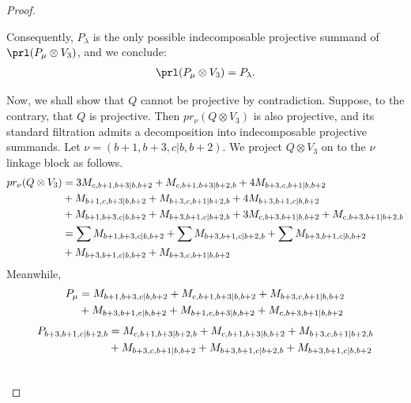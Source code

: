 \begin{proof}
\begin{enumerate}
\begin{enumerate}
Consequently, $P_\lambda$ is the only possible indecomposable projective summand of $\prl(P_\mu \otimes V_3)$, and we conclude:
\begin{equation}\notag
  \begin{aligned}
\prl(P_\mu \otimes V_3) = P_\lambda.
  \end{aligned}
\end{equation}

Now, we shall show that $Q$ cannot be projective by contradiction.
Suppose, to the contrary, that $Q$ is projective. Then $pr_\nu(Q \otimes V_3)$ is also projective, and its standard filtration admits a decomposition into indecomposable projective summands.
Let $\nu = (b+1,b+3,c|b,b+2)$. We project $Q \otimes V_3$ on to the $\nu$ linkage block as follows.
\begin{equation}\notag
  \begin{aligned}
    pr_\nu(Q \otimes V_3) &= 
3M_{c,b+1,b+3|b,b+2}
+M_{c,b+1,b+3|b+2,b}
+4M_{b+3,c,b+1|b,b+2}\\
                                              &
+M_{b+1,c,b+3|b,b+2}
+M_{b+3,c,b+1|b+2,b}
+4M_{b+3,b+1,c|b,b+2}\\
                                              &
+M_{b+1,b+3,c|b,b+2}
+M_{b+3,b+1,c|b+2,b}
+3M_{c,b+3,b+1|b,b+2}
+M_{c,b+3,b+1|b+2,b} \\
            &=
\sum M_{b+1,b+3,c|b,b+2}
+\sum M_{b+3,b+1,c|b+2,b}
+\sum M_{b+3,b+1,c|b,b+2}\\
                                              &
+M_{b+3,b+1,c|b,b+2}
+M_{b+3,c,b+1|b,b+2}
  \end{aligned}
\end{equation}
Meanwhile,
\begin{equation}\notag
  \begin{aligned}
    P_\mu &= M_{b+1,b+3,c|b,b+2}
+M_{c,b+1,b+3|b,b+2}
+M_{b+3,c,b+1|b,b+2}\\
                                              &
+M_{b+3,b+1,c|b,b+2}
+M_{b+1,c,b+3|b,b+2}
+M_{c,b+3,b+1|b,b+2}
  \end{aligned}
\end{equation}
\begin{equation}\notag
  \begin{aligned}
    P_{b+3,b+1,c|b+2,b} &= 
    M_{c,b+1,b+3|b+2,b}
+M_{c,b+1,b+3|b,b+2}
+M_{b+3,c,b+1|b+2,b}\\
                                              &
+M_{b+3,c,b+1|b,b+2}
+M_{b+3,b+1,c|b+2,b}
+M_{b+3,b+1,c|b,b+2}\\
                                              &

\end{aligned}
\end{equation}
\end{enumerate}
\end{enumerate}
\end{proof}
